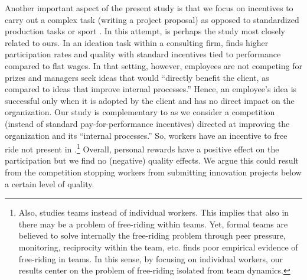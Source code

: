 \documentclass[11pt, titlepage]{article}
\begin{document}
Another important aspect of the present study is that we focus on
incentives to carry out a complex task (writing a project proposal) as
opposed to standardized production tasks \citep{knoeber1994testing} or
sport \citep{ehrenberg1990tournaments}. In this attempt,
\citet{gibbs2014field} is perhaps the study most closely related to
ours. In an ideation task within a consulting firm,
\citet{gibbs2014field} finds higher participation rates and quality with
standard incentives tied to performance compared to flat wages. In that
setting, however, employees are not competing for prizes and managers
seek ideas that would ``directly benefit the client, as compared to
ideas that improve internal processes.'' Hence, an employee's idea is
successful only when it is adopted by the client and has no direct
impact on the organization. Our study is complementary to
\citet{gibbs2014field} as we consider a competition (instead of standard
pay-for-performance incentives) directed at improving the organization
and its ``internal processes.'' So, workers have an incentive to free
ride not present in \citet{gibbs2014field}.\footnote{Also,
  \citet{gibbs2014field} studies teams instead of individual workers.
  This implies that also in \citet{gibbs2014field} there may be a
  problem of free-riding within teams. Yet, formal teams are believed to
  solve internally the free-riding problem through peer pressure,
  monitoring, reciprocity within the team, etc. \citet{hamilton2003team}
  finds poor empirical evidence of free-riding in teams. In this sense,
  by focusing on individual workers, our results center on the problem
  of free-riding isolated from team dynamics.} Overall, personal rewards
have a positive effect on the participation but we find no (negative)
quality effects. We argue this could result from the competition
stopping workers from submitting innovation projects below a certain
level of quality.
\end{document}

